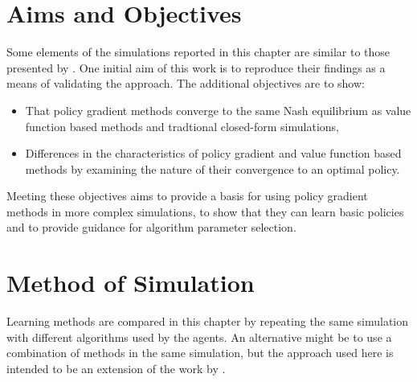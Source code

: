 \section{Aims and Objectives}
Some elements of the simulations reported in this chapter are similar to those
presented by .  One initial aim of this work is to
reproduce their findings as a means of validating the approach.  The additional
objectives are to show:
\begin{itemize}
  \item That policy gradient methods converge to the same Nash equilibrium as
  value function based methods and tradtional closed-form simulations,
  \item Differences in the characteristics of policy gradient and value
  function based methods by examining the nature of their convergence to an
  optimal policy.
\end{itemize}
Meeting these objectives aims to provide a basis for using policy gradient
methods in more complex simulations, to show that they can learn basic policies
and to provide guidance for algorithm parameter selection.

\section{Method of Simulation}
Learning methods are compared in this chapter by repeating the same
simulation with different algorithms used by the agents.  An alternative
might be to use a combination of methods in the same simulation, but the
approach used here is intended to be an extension of the work by
.

